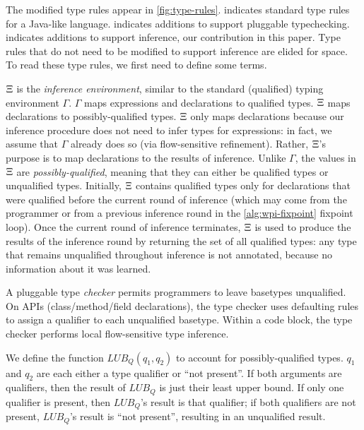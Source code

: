 The modified type rules appear in \cref{fig:type-rules}.  indicates
standard type rules for a Java-like language.  indicates additions to support
pluggable typechecking.  indicates additions to support inference, \ie our
contribution in this paper.
%
Type rules that do not need to be modified to support inference are elided for space.
%
To read these type rules, we first need to define some terms.

$\Xi$ is the \emph{inference environment}, similar to the standard (qualified)
typing environment $\Gamma$. $\Gamma$ maps expressions and declarations to qualified types.
$\Xi$ maps declarations to possibly-qualified types.
$\Xi$ only maps declarations because our inference procedure does not need to infer
types for expressions: in fact, we assume that $\Gamma$ already does so (via flow-sensitive
refinement). Rather, $\Xi$'s purpose is to map declarations to the results of inference.
Unlike $\Gamma$, the values in $\Xi$ are \emph{possibly-qualified}, meaning that they can either
be qualified types or unqualified types. Initially, $\Xi$ contains qualified types only
for declarations that were qualified before the current round of inference (which may come from
the programmer or from a previous inference round in the \cref{alg:wpi-fixpoint} fixpoint loop).
Once the current round of inference terminates, $\Xi$ is used to produce the results of the
inference round by returning the set of all qualified types: any type that remains unqualified
throughout inference is not annotated, because no information about it was learned.

A pluggable type \emph{checker} permits programmers to leave basetypes unqualified.
On APIs (class/method/field declarations), the type checker uses defaulting
rules to assign a qualifier to each unqualified basetype.
Within a code block, the type checker performs local flow-sensitive type
inference.


We define the function $\mathit{LUB_Q}(q_1, q_2)$ to account for possibly-qualified types.
$q_1$ and $q_2$ are each either a type qualifier or ``not present''.
If both arguments are qualifiers, then the result of $\mathit{LUB_Q}$
is just their least upper bound. If only one qualifier is present, then $\mathit{LUB_Q}$'s result
is that qualifier; if both qualifiers are not present, $\mathit{LUB_Q}$'s result is ``not present'',
resulting in an unqualified result.



